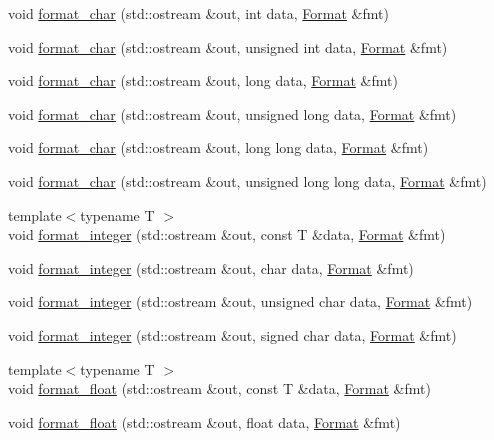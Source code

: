 \begin{DoxyCompactItemize}
\item 
void \hyperlink{namespacecp_ad0a44d88420011ebcb330f4df4ac2a7a}{format\_\-char} (std::ostream \&out, int data, \hyperlink{structcp_1_1Format}{Format} \&fmt)
\item 
void \hyperlink{namespacecp_a7cb425445512ed4efca5c3becf5c4d31}{format\_\-char} (std::ostream \&out, unsigned int data, \hyperlink{structcp_1_1Format}{Format} \&fmt)
\item 
void \hyperlink{namespacecp_a54389ebf91bc95580ab42b9bd57e9fc9}{format\_\-char} (std::ostream \&out, long data, \hyperlink{structcp_1_1Format}{Format} \&fmt)
\item 
void \hyperlink{namespacecp_a21ae8cc02481a788f7e3072f23eacbd2}{format\_\-char} (std::ostream \&out, unsigned long data, \hyperlink{structcp_1_1Format}{Format} \&fmt)
\item 
void \hyperlink{namespacecp_a7511f1c332986a17854f42421d4362c5}{format\_\-char} (std::ostream \&out, long long data, \hyperlink{structcp_1_1Format}{Format} \&fmt)
\item 
void \hyperlink{namespacecp_ae70d3faeee016080d264d2693275f008}{format\_\-char} (std::ostream \&out, unsigned long long data, \hyperlink{structcp_1_1Format}{Format} \&fmt)
\item 
{\footnotesize template$<$typename T $>$ }\\void \hyperlink{namespacecp_a0ec2cefdf66b27770aa1282096ec027f}{format\_\-integer} (std::ostream \&out, const T \&data, \hyperlink{structcp_1_1Format}{Format} \&fmt)
\item 
void \hyperlink{namespacecp_abdef834401138d6ef18eef43c4f889b8}{format\_\-integer} (std::ostream \&out, char data, \hyperlink{structcp_1_1Format}{Format} \&fmt)
\item 
void \hyperlink{namespacecp_adbaf7e97e476a81d8f558dba458de4e4}{format\_\-integer} (std::ostream \&out, unsigned char data, \hyperlink{structcp_1_1Format}{Format} \&fmt)
\item 
void \hyperlink{namespacecp_a0c00898edd5c59413de79d1e79afc0d2}{format\_\-integer} (std::ostream \&out, signed char data, \hyperlink{structcp_1_1Format}{Format} \&fmt)
\item 
{\footnotesize template$<$typename T $>$ }\\void \hyperlink{namespacecp_a63b4184f62502d169eea5a4d2d66ebba}{format\_\-float} (std::ostream \&out, const T \&data, \hyperlink{structcp_1_1Format}{Format} \&fmt)
\item 
void \hyperlink{namespacecp_aa97e39eb705c0bce5b4d1bb37d62a184}{format\_\-float} (std::ostream \&out, float data, \hyperlink{structcp_1_1Format}{Format} \&fmt)

\end{DoxyCompactItemize}
